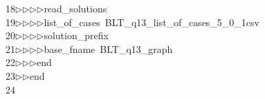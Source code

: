 \begin{tabbing}
18\>$\triangleright$\>$\triangleright$\>$\triangleright$\>$\triangleright$\>read\_solutions\ \\[0pt]
19\>$\triangleright$\>$\triangleright$\>$\triangleright$\>$\triangleright$\>list\_of\_cases\ BLT\_q13\_list\_of\_cases\_5\_0\_1csv\ \\[0pt]
20\>$\triangleright$\>$\triangleright$\>$\triangleright$\>$\triangleright$\>solution\_prefix\ \ \\[0pt]
21\>$\triangleright$\>$\triangleright$\>$\triangleright$\>$\triangleright$\>base\_fname\ BLT\_q13\_graph\ \\[0pt]
22\>$\triangleright$\>$\triangleright$\>$\triangleright$\>end\ \\[0pt]
23\>$\triangleright$\>$\triangleright$\>end\\[0pt]
24\>\end{tabbing}
